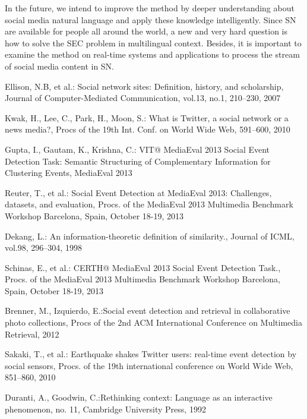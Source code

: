 \documentclass{llncs}
\begin{document}
In the future, we intend to improve the method by deeper understanding about social media natural language and apply these knowledge intelligently. Since SN are available for people all around the world, a new and very hard question is how to solve the SEC problem in multilingual context. Besides, it is important to examine the method on real-time systems and applications to process the stream of social media content in SN.

%
%
\begin{thebibliography}{}
%

Ellison, N.B, et al.: Social network sites: Definition, history, and scholarship, Journal of Computer-Mediated Communication, vol.13, no.1, 210--230, 2007

Kwak, H., Lee, C., Park, H., Moon, S.:
What is Twitter, a social network or a news media?,
Procs of the 19th Int. Conf. on World Wide Web, 591--600, 2010

Gupta, I., Gautam, K., Krishna, C.:
VIT@ MediaEval 2013 Social Event Detection Task: Semantic Structuring of Complementary Information for Clustering Events, MediaEval 2013

Reuter, T., et al.: Social Event Detection at MediaEval 2013: Challenges, datasets, and evaluation, Procs. of the MediaEval 2013 Multimedia Benchmark Workshop Barcelona, Spain, October 18-19, 2013

Dekang, L.: An information-theoretic definition of similarity.,
Journal of ICML, vol.98, 296--304, 1998

Schinas, E., et al.:
CERTH@ MediaEval 2013 Social Event Detection Task.,
Procs. of the MediaEval 2013 Multimedia Benchmark Workshop Barcelona, Spain, October 18-19, 2013

Brenner, M., Izquierdo, E.:Social event detection and retrieval in collaborative photo collections,
Procs of the 2nd ACM International Conference on Multimedia Retrieval, 2012

Sakaki, T., et al.: Earthquake shakes Twitter users: real-time event detection by social sensors,
Procs. of the 19th international conference on World Wide Web, 851--860, 2010

Duranti, A., Goodwin, C.:Rethinking context: Language as an interactive phenomenon, no. 11, Cambridge University Press, 1992


\end{thebibliography}
\end{document}
